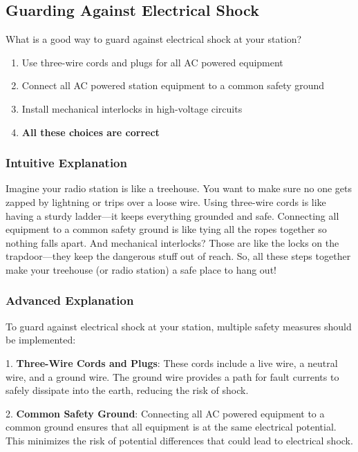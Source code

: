 \subsection{Guarding Against Electrical Shock}
\label{T0A06}

\begin{tcolorbox}[colback=gray!10!white,colframe=black!75!black,title=T0A06]
What is a good way to guard against electrical shock at your station?
\begin{enumerate}[label=\Alph*)]
    \item Use three-wire cords and plugs for all AC powered equipment
    \item Connect all AC powered station equipment to a common safety ground
    \item Install mechanical interlocks in high-voltage circuits
    \item \textbf{All these choices are correct}
\end{enumerate}
\end{tcolorbox}

\subsubsection{Intuitive Explanation}
Imagine your radio station is like a treehouse. You want to make sure no one gets zapped by lightning or trips over a loose wire. Using three-wire cords is like having a sturdy ladder—it keeps everything grounded and safe. Connecting all equipment to a common safety ground is like tying all the ropes together so nothing falls apart. And mechanical interlocks? Those are like the locks on the trapdoor—they keep the dangerous stuff out of reach. So, all these steps together make your treehouse (or radio station) a safe place to hang out!

\subsubsection{Advanced Explanation}
To guard against electrical shock at your station, multiple safety measures should be implemented:

1. \textbf{Three-Wire Cords and Plugs}: These cords include a live wire, a neutral wire, and a ground wire. The ground wire provides a path for fault currents to safely dissipate into the earth, reducing the risk of shock.

2. \textbf{Common Safety Ground}: Connecting all AC powered equipment to a common ground ensures that all equipment is at the same electrical potential. This minimizes the risk of potential differences that could lead to electrical shock.

